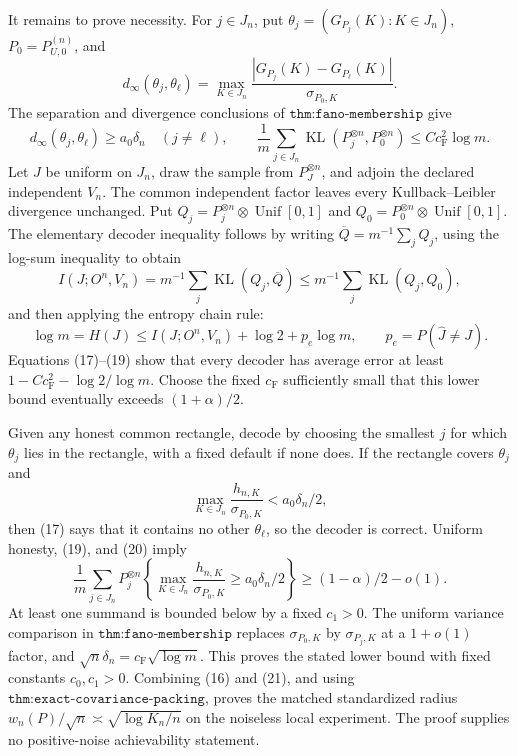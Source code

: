 It remains to prove necessity.  For \(j\in J_n\), put \(\theta_j=(G_{P_j}(K):K\in J_n)\), \(P_0=P_{U,0}^{(n)}\), and
\[
 d_\infty(\theta_j,\theta_\ell)=
 \max_{K\in J_n}\frac{|G_{P_j}(K)-G_{P_\ell}(K)|}{\sigma_{P_0,K}}.
\]
The separation and divergence conclusions of \(\texttt{thm:fano-membership}\) give
\[
 d_\infty(\theta_j,\theta_\ell)\geq a_0\delta_n\quad(j\neq\ell),
 \qquad
 \frac1m\sum_{j\in J_n}\operatorname{KL}(P_j^{\otimes n},P_0^{\otimes n})
 \leq Cc_{\mathrm F}^2\log m.                                               \tag{17}
\]
Let \(J\) be uniform on \(J_n\), draw the sample from \(P_J^{\otimes n}\), and adjoin the declared independent \(V_n\).  The common independent factor leaves every Kullback--Leibler divergence unchanged.  Put \(Q_j=P_j^{\otimes n}\otimes\operatorname{Unif}[0,1]\) and \(Q_0=P_0^{\otimes n}\otimes\operatorname{Unif}[0,1]\).  The elementary decoder inequality follows by writing \(\overline Q=m^{-1}\sum_jQ_j\), using the log-sum inequality to obtain
\[
 I(J;O^n,V_n)=m^{-1}\sum_j\operatorname{KL}(Q_j,\overline Q)
 \leq m^{-1}\sum_j\operatorname{KL}(Q_j,Q_0),                              \tag{18}
\]
and then applying the entropy chain rule:
\[
 \log m=H(J)\leq I(J;O^n,V_n)+\log2+p_e\log m,
 \qquad p_e=P(\widehat J\neq J).                                           \tag{19}
\]
Equations (17)--(19) show that every decoder has average error at least \(1-Cc_{\mathrm F}^2-\log2/\log m\).  Choose the fixed \(c_{\mathrm F}\) sufficiently small that this lower bound eventually exceeds \((1+\alpha)/2\).

Given any honest common rectangle, decode by choosing the smallest \(j\) for which \(\theta_j\) lies in the rectangle, with a fixed default if none does.  If the rectangle covers \(\theta_j\) and
\[
 \max_{K\in J_n}\frac{h_{n,K}}{\sigma_{P_0,K}}<a_0\delta_n/2,              \tag{20}
\]
then (17) says that it contains no other \(\theta_\ell\), so the decoder is correct.  Uniform honesty, (19), and (20) imply
\[
 \frac1m\sum_{j\in J_n}P_j^{\otimes n}\!\left\{
 \max_{K\in J_n}\frac{h_{n,K}}{\sigma_{P_0,K}}
 \geq a_0\delta_n/2\right\}
 \geq(1-\alpha)/2-o(1).                                                      \tag{21}
\]
At least one summand is bounded below by a fixed \(c_1>0\).  The uniform variance comparison in \(\texttt{thm:fano-membership}\) replaces \(\sigma_{P_0,K}\) by \(\sigma_{P_j,K}\) at a \(1+o(1)\) factor, and \(\sqrt n\delta_n=c_{\mathrm F}\sqrt{\log m}\).  This proves the stated lower bound with fixed constants \(c_0,c_1>0\).  Combining (16) and (21), and using \(\texttt{thm:exact-covariance-packing}\), proves the matched standardized radius \(w_n(P)/\sqrt n\asymp\sqrt{\log K_n/n}\) on the noiseless local experiment.  The proof supplies no positive-noise achievability statement.